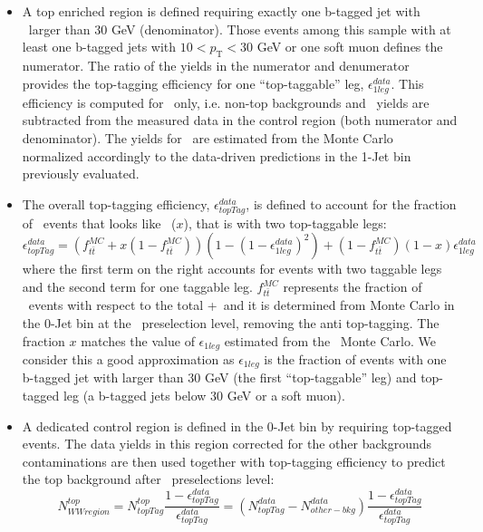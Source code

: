 \begin{itemize}

\item 
A top enriched region is defined requiring exactly one b-tagged jet
with \pt\ larger than $30$ GeV (denominator).  Those events among this
sample with at least one b-tagged jets with
$10<\ensuremath{p_\mathrm{T}}<30$ GeV or one soft muon defines the
numerator. The ratio of the yields in the numerator and denumerator
provides the top-tagging efficiency for one ``top-taggable'' leg,
$\epsilon_{1leg}^{data}$.
This efficiency is computed for \ttbar\ only, i.e. non-top 
backgrounds and \tw\ yields are subtracted from the measured data in 
the control region (both numerator and denominator).  
The yields for \tw\ are estimated from the Monte Carlo normalized accordingly to
the data-driven predictions in the 1-Jet bin previously evaluated.

\item 
The overall top-tagging efficiency, $\epsilon_{topTag}^{data}$, is
defined to account for the fraction of \tw\ events that looks
like \ttbar\ ($x$), that is with two top-taggable legs:
\begin{equation} \label{eq:newTopTagEff}
\epsilon_{topTag}^{data} = (f_{t\bar{t}}^{MC} + x(1-f_{t\bar{t}}^{MC}) )(1-(1-\epsilon_{1leg}^{data})^2) + (1-f_{t\bar{t}}^{MC})(1-x)\epsilon_{1leg}^{data}
\end{equation} 
where the first term on the right accounts for events with two taggable
legs and the second term for one taggable leg. 
$f_{t\bar{t}}^{MC}$ represents the fraction of \ttbar\ events with respect to the total \ttbar+\tw\ 
and it is determined from Monte Carlo in the 0-Jet bin at the \WW\ preselection level, removing the anti top-tagging.
The fraction $x$ matches the value of $\epsilon_{1leg}$ estimated from
the \tw\ Monte Carlo.  We consider this a good approximation as
$\epsilon_{1leg}$ is the fraction of events with one b-tagged jet
with \pt larger than 30 GeV (the first ``top-taggable'' leg) and
top-tagged leg (a b-tagged jets below 30 GeV or a soft muon).

\item 
A dedicated control region is defined in the 0-Jet bin by requiring
top-tagged events.  The data yields in this region corrected for the
other backgrounds contaminations are then used together with
top-tagging efficiency to predict the top background after \WW\
preselections level:
\begin{equation} \label{eq:topExtrapolation}
N^{top}_{WW region}=N_{topTag}^{top}\frac{1-\epsilon_{topTag}^{data}}{\epsilon_{topTag}^{data}} = 
(N_{topTag}^{data}-N_{other-bkg}^{data})\frac{1-\epsilon_{topTag}^{data}}{\epsilon_{topTag}^{data}}
\end{equation} 

\end{itemize}

